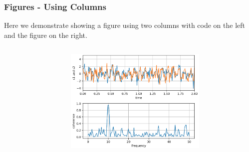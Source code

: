 \documentclass[t]{beamer}
\begin{document}
\begin{frame}[fragile=singleslide]
  \frametitle{Figures - Using Columns}
  \vspace{-10pt}

  Here we demonstrate showing a figure using two columns with code on the left
  and the figure on the right.

  \hrulefill{}

  \begin{columns}[T]
    \begin{column}{.5\textwidth}
      \vspace{-5pt}
      \inputminted[fontsize=\footnotesize]{python}{code/sample_mpl.py}
    \end{column}

    \begin{column}{.5\textwidth}          
      \centering
      \includegraphics[height=5cm]{figures/sample_mpl.png}
    \end{column}

  \end{columns}

\end{frame}


\end{document}
